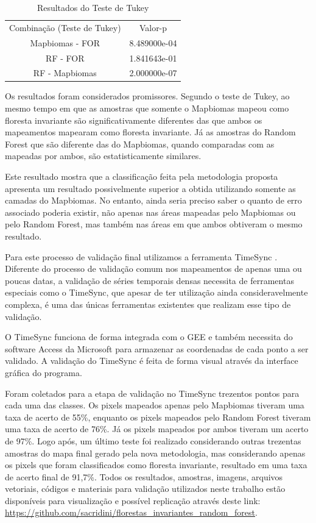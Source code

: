 \begin{table}[h!]
    \centering
    \begin{tabular}{|c | c|}
    Combinação (Teste de Tukey) &  Valor-p      \\
                Mapbiomas - FOR &  8.489000e-04 \\
                       RF - FOR &  1.841643e-01 \\
                 RF - Mapbiomas &  2.000000e-07 \\
    \end{tabular}
    \caption{Resultados do Teste de Tukey}
    \label{tab:2}
\end{table}

Os resultados foram considerados promissores. Segundo o teste de Tukey, ao mesmo tempo em que as amostras que somente o Mapbiomas mapeou como floresta invariante são significativamente diferentes das que ambos os mapeamentos mapearam como floresta invariante. Já as amostras do Random Forest que são diferente das do Mapbiomas, quando comparadas com as mapeadas por ambos, são estatisticamente similares.

Este resultado mostra que a classificação feita pela metodologia proposta apresenta um resultado possivelmente superior a obtida utilizando somente as camadas do Mapbiomas. No entanto, ainda seria preciso saber o quanto de erro associado poderia existir, não apenas nas áreas mapeadas pelo Mapbiomas ou pelo Random Forest, mas também nas áreas em que ambos obtiveram o mesmo resultado.

Para este processo de validação final utilizamos a ferramenta TimeSync \citep{COHEN20102911}. Diferente do processo de validação comum nos mapeamentos de apenas uma ou poucas datas, a validação de séries temporais densas necessita de ferramentas especiais como o TimeSync, que apesar de ter utilização ainda consideravelmente complexa, é uma das únicas ferramentas existentes que realizam esse tipo de validação. 

O TimeSync funciona de forma integrada com o GEE e também necessita do software Access da Microsoft para armazenar as coordenadas de cada ponto a ser validado. A validação do TimeSync é feita de forma visual através da interface gráfica do programa.

Foram coletados para a etapa de validação no TimeSync trezentos pontos para cada uma das classes. Os pixels mapeados apenas pelo Mapbiomas tiveram uma taxa de acerto de 55\%, enquanto os pixels mapeados pelo Random Forest tiveram uma taxa de acerto de 76\%. Já os pixels mapeados por ambos tiveram um acerto de 97\%. Logo após, um último teste foi realizado considerando outras trezentas amostras do mapa final gerado pela nova metodologia, mas considerando apenas os pixels que foram classificados como floresta invariante, resultado em uma taxa de acerto final de 91,7\%. Todos os resultados, amostras, imagens, arquivos vetoriais, códigos e materiais para validação utilizados neste trabalho estão disponíveis para visualização e possível replicação através deste link: \url{https://github.com/sacridini/florestas\_invariantes\_random\_forest}.

